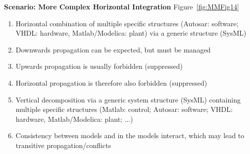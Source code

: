 {{\bf Scenario: More Complex Horizontal Integration } Figure~\ref{fig:MMFig14}

\begin{enumerate}
    \item Horizontal combination of multiple specific structures (Autosar: software; VHDL: hardware, Matlab/Modelica: plant) via a generic structure (SysML) 
\item Downwards propagation can be expected, but must be managed
\item Upwards propagation is usually forbidden (suppressed)
\item Horizontal propagation is therefore also forbidden (suppressed)
\item Vertical decomposition via a generic system structure (SysML) containing multiple specific structures (Matlab: control; Autosar: software; VHDL: hardware, Matlab/Modelica: plant; ...)
\item Consistency between models and in the models interact, which may lead to transitive propagation/conflicts
    
\end{enumerate}

}

